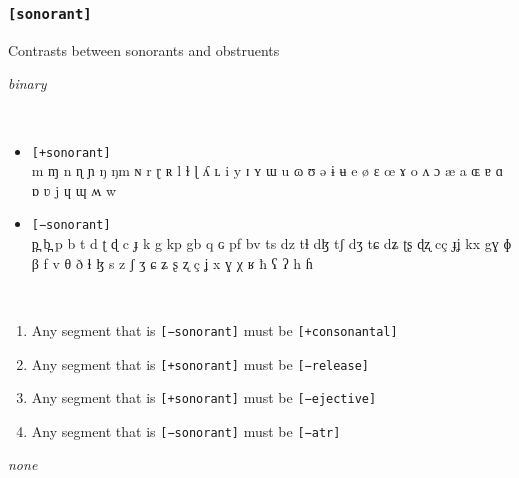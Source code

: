 \documentclass[10pt,letterpaper]{article}
\begin{document}
\subsubsection{\texttt{[sonorant]}}
\label{ssub:feature_sonorant}
\begin{samepage}
\begin{description}
\itemsep1pt \parskip0pt  
\item[Descritpion] Contrasts between sonorants and obstruents
\item[Type] \emph{binary}
\item[Examples]\
  \begin{itemize}
    \item \texttt{[+sonorant]}\\
    m ɱ n ɳ ɲ ŋ ŋm ɴ r ɽ ʀ l ɫ ɭ ʎ ʟ i y ɪ ʏ ɯ u ɷ ʊ ə ɨ ʉ e ø ɛ œ ɤ o ʌ ɔ æ a ɶ ɐ ɑ ɒ ʋ j ɥ ɰ ʍ w 
    \item \texttt{[−sonorant]}\\
     p̪ b̪ p b t d ʈ ɖ c ɟ k g kp gb q ɢ pf bv ts dz tɬ dɮ tʃ dʒ tɕ dʑ ʈʂ ɖʐ cç ɟʝ kx gɣ ɸ β f v θ ð ɬ ɮ s z ʃ ʒ ɕ ʑ ʂ ʐ ç ʝ x ɣ χ ʁ ħ ʕ ʔ h ɦ
  \end{itemize}
\item[Constraints]\
  \begin{enumerate}
  \itemsep1pt \parskip0pt  
    \item Any segment that is \texttt{[−sonorant]} must be \texttt{[+consonantal]}
    \item Any segment that is \texttt{[+sonorant]} must be \texttt{[−release]}
    \item Any segment that is \texttt{[+sonorant]} must be \texttt{[−ejective]}
    \item Any segment that is \texttt{[−sonorant]} must be \texttt{[−atr]}
  \end{enumerate}
\item[Resctrictions] \emph{none}
\end{description}
\end{samepage}
\end{document}
